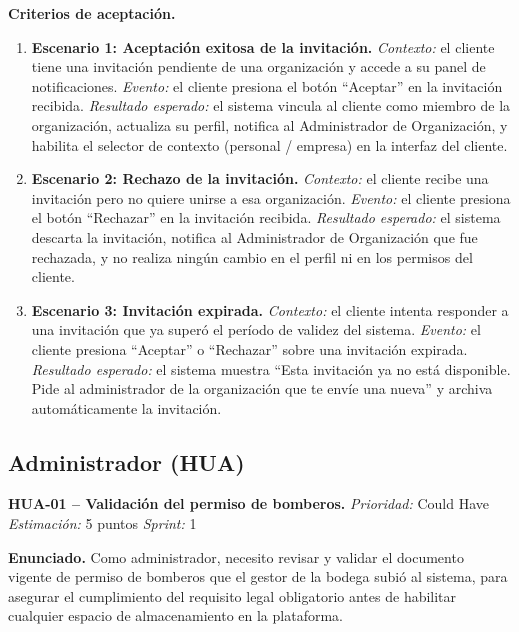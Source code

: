 \textbf{Criterios de aceptación.}
\begin{enumerate}
\item \textbf{Escenario 1: Aceptación exitosa de la invitación.} \textit{Contexto:} el cliente tiene una invitación pendiente de una organización y accede a su panel de notificaciones. \textit{Evento:} el cliente presiona el botón ``Aceptar'' en la invitación recibida. \textit{Resultado esperado:} el sistema vincula al cliente como miembro de la organización, actualiza su perfil, notifica al Administrador de Organización, y habilita el selector de contexto (personal / empresa) en la interfaz del cliente.
\item \textbf{Escenario 2: Rechazo de la invitación.} \textit{Contexto:} el cliente recibe una invitación pero no quiere unirse a esa organización. \textit{Evento:} el cliente presiona el botón ``Rechazar'' en la invitación recibida. \textit{Resultado esperado:} el sistema descarta la invitación, notifica al Administrador de Organización que fue rechazada, y no realiza ningún cambio en el perfil ni en los permisos del cliente.
\item \textbf{Escenario 3: Invitación expirada.} \textit{Contexto:} el cliente intenta responder a una invitación que ya superó el período de validez del sistema. \textit{Evento:} el cliente presiona ``Aceptar'' o ``Rechazar'' sobre una invitación expirada. \textit{Resultado esperado:} el sistema muestra ``Esta invitación ya no está disponible. Pide al administrador de la organización que te envíe una nueva'' y archiva automáticamente la invitación.
\end{enumerate}

\clearpage
\subsection{Administrador (HUA)}

\textbf{HUA-01 -- Validación del permiso de bomberos.} \label{req:HUA-01}
\textit{Prioridad:} Could Have \quad \textit{Estimación:} 5 puntos \quad \textit{Sprint:} 1

\textbf{Enunciado.} Como administrador, necesito revisar y validar el documento vigente de permiso de bomberos que el gestor de la bodega subió al sistema, para asegurar el cumplimiento del requisito legal obligatorio antes de habilitar cualquier espacio de almacenamiento en la plataforma.

